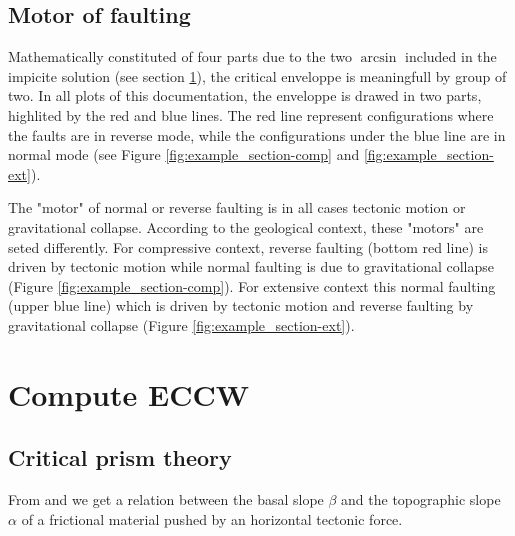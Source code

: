 \documentclass[a4paper]{scrartcl}
\begin{document}
\subsection{Motor of faulting}

Mathematically constituted of four parts due to the two $\arcsin$ included in the impicite solution (see section \ref{sec:compute_ECCW}), the critical enveloppe is meaningfull by group of two.
In all plots of this documentation, the enveloppe is drawed in two parts, highlited by the red and blue lines.
The red line represent configurations where the faults are in reverse mode, while the configurations under the blue line are in normal mode (see Figure \ref{fig:example_section-comp} and \ref{fig:example_section-ext}).

The "motor" of normal or reverse faulting is in all cases tectonic motion or gravitational collapse.
According to the geological context, these "motors" are seted differently.
For compressive context, reverse faulting (bottom red line) is driven by tectonic motion while normal faulting is due to gravitational collapse (Figure \ref{fig:example_section-comp}).
For extensive context this normal faulting (upper blue line) which is driven by tectonic motion and reverse faulting by gravitational collapse (Figure \ref{fig:example_section-ext}).




\newpage
\section{Compute ECCW}
\label{sec:compute_ECCW}

\subsection{Critical prism theory}


From \cite{Dahlen1984} and \cite{Yuan2015} we get a relation between the basal slope $\beta$ and the topographic slope $\alpha$ of a frictional material pushed by an horizontal tectonic force.

\end{document}
